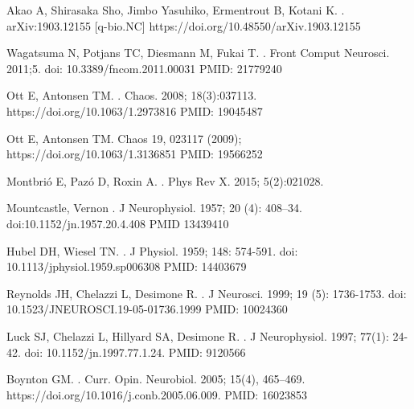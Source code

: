 \documentclass[10pt,letterpaper]{article}
\begin{document}
\begin{thebibliography}{10}
Akao A, Shirasaka Sho, Jimbo Yasuhiko, Ermentrout B, Kotani K.
.
\newblock 	arXiv:1903.12155 [q-bio.NC] https://doi.org/10.48550/arXiv.1903.12155

Wagatsuma N, Potjans TC, Diesmann M, Fukai T.
.
\newblock Front Comput Neurosci. 2011;5. doi: 10.3389/fncom.2011.00031 PMID: 21779240

Ott E, Antonsen TM.
.
\newblock Chaos. 2008; 18(3):037113. https://doi.org/10.1063/1.2973816 PMID: 19045487

Ott E, Antonsen TM.
\newblock Chaos 19, 023117 (2009); https://doi.org/10.1063/1.3136851 PMID: 19566252

Montbrió E, Pazó D, Roxin A.
.
\newblock Phys Rev X. 2015; 5(2):021028.

Mountcastle, Vernon
.
\newblock J Neurophysiol. 1957; 20 (4): 408–34. doi:10.1152/jn.1957.20.4.408 PMID 13439410

Hubel DH, Wiesel TN.
.
\newblock J Physiol. 1959; 148: 574-591. doi: 10.1113/jphysiol.1959.sp006308 PMID: 14403679

Reynolds JH, Chelazzi L, Desimone R.
.
\newblock J Neurosci. 1999; 19 (5): 1736-1753. doi: 10.1523/JNEUROSCI.19-05-01736.1999 PMID: 10024360

Luck SJ, Chelazzi L, Hillyard SA, Desimone R.
.
\newblock J Neurophysiol. 1997; 77(1): 24-42. doi: 10.1152/jn.1997.77.1.24. PMID: 9120566

Boynton GM.
.
\newblock Curr. Opin. Neurobiol. 2005; 15(4), 465–469. https://doi.org/10.1016/j.conb.2005.06.009. PMID: 16023853


\end{thebibliography}
\end{document}
